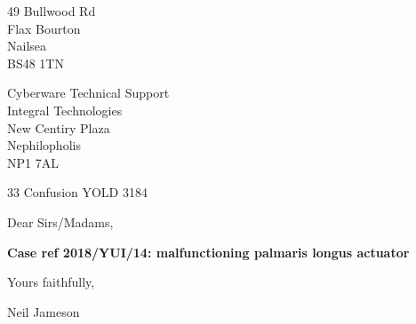 \documentclass[11pt,a4paper]{letter}
\begin{document}
\begin{letter}

\thispagestyle{empty}

\begin{flushright}
49 Bullwood Rd\\
Flax Bourton\\
Nailsea\\
BS48 1TN
\end{flushright}

Cyberware Technical Support\\
Integral Technologies\\
New Centiry Plaza\\
Nephilopholis\\
NP1 7AL

33 Confusion YOLD 3184

Dear Sirs/Madams,

\textbf{Case ref 2018/YUI/14: malfunctioning palmaris longus actuator}

\Blindtext

Yours faithfully,

\vspace{15mm}
Neil Jameson

\end{letter}
\end{document}
